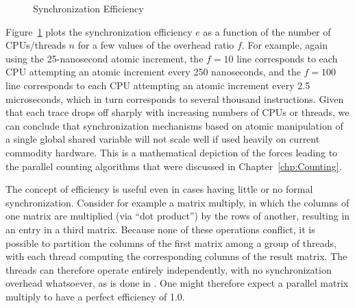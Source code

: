 \begin{figure}[tbp]
\begin{center}
\end{center}
\caption{Synchronization Efficiency}
\label{fig:SMPdesign:Synchronization Efficiency}
\end{figure}

Figure~\ref{fig:SMPdesign:Synchronization Efficiency} plots the synchronization
efficiency $e$ as a function of the number of CPUs/threads $n$ for
a few values of the overhead ratio $f$.
For example, again using the 25-nanosecond atomic increment, the
$f=10$ line corresponds to each CPU attempting an atomic increment
every 250 nanoseconds, and the $f=100$ line corresponds to each
CPU attempting an atomic increment every 2.5 microseconds,
which in turn corresponds to several thousand instructions.
Given that each trace drops off sharply with increasing numbers of
CPUs or threads, we can conclude that
synchronization mechanisms based on
atomic manipulation of a single global shared variable will not
scale well if used heavily on current commodity hardware.
This is a mathematical depiction of the forces leading to the parallel
counting algorithms that were discussed in Chapter~\ref{chp:Counting}.

The concept of efficiency is useful even in cases having little or
no formal synchronization.
Consider for example a matrix multiply, in which the columns of one
matrix are multiplied (via ``dot product'') by the rows of another,
resulting in an entry in a third matrix.
Because none of these operations conflict, it is possible to partition
the columns of the first matrix among a group of threads, with each thread
computing the corresponding columns of the result matrix.
The threads can therefore operate entirely independently, with no
synchronization overhead whatsoever, as is done in
.
One might therefore expect a parallel matrix multiply to have a
perfect efficiency of 1.0.

